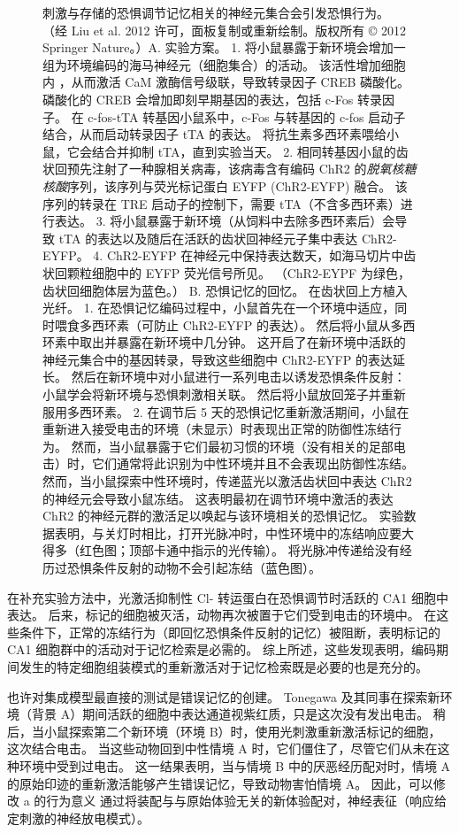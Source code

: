 \begin{figure}[htbp]
	\caption{刺激与存储的恐惧调节记忆相关的神经元集合会引发恐惧行为。 （经 Liu et al. 2012 许可，面板复制或重新绘制。版权所有 © 2012 Springer Nature。）A. 实验方案。 1. 将小鼠暴露于新环境会增加一组为环境编码的海马神经元（细胞集合）的活动。 该活性增加细胞内 ，从而激活 CaM 激酶信号级联，导致转录因子 CREB 磷酸化。 磷酸化的 CREB 会增加即刻早期基因的表达，包括 c-Fos 转录因子。 在 c-fos-tTA 转基因小鼠系中，c-Fos 与转基因的 c-fos 启动子结合，从而启动转录因子 tTA 的表达。 将抗生素多西环素喂给小鼠，它会结合并抑制 tTA，直到实验当天。 2. 相同转基因小鼠的齿状回预先注射了一种腺相关病毒，该病毒含有编码 ChR2 的\textit{脱氧核糖核酸}序列，该序列与荧光标记蛋白 EYFP (ChR2-EYFP) 融合。 该序列的转录在 TRE 启动子的控制下，需要 tTA（不含多西环素）进行表达。 3. 将小鼠暴露于新环境（从饲料中去除多西环素后）会导致 tTA 的表达以及随后在活跃的齿状回神经元子集中表达 ChR2-EYFP。 4. ChR2-EYFP 在神经元中保持表达数天，如海马切片中齿状回颗粒细胞中的 EYFP 荧光信号所见。 （ChR2-EYPF 为绿色，齿状回细胞体层为蓝色。） B. 恐惧记忆的回忆。 在齿状回上方植入光纤。 1. 在恐惧记忆编码过程中，小鼠首先在一个环境中适应，同时喂食多西环素（可防止 ChR2-EYFP 的表达）。 然后将小鼠从多西环素中取出并暴露在新环境中几分钟。 这开启了在新环境中活跃的神经元集合中的基因转录，导致这些细胞中 ChR2-EYFP 的表达延长。 然后在新环境中对小鼠进行一系列电击以诱发恐惧条件反射：小鼠学会将新环境与恐惧刺激相关联。 然后将小鼠放回笼子并重新服用多西环素。 2. 在调节后 5 天的恐惧记忆重新激活期间，小鼠在重新进入接受电击的环境（未显示）时表现出正常的防御性冻结行为。 然而，当小鼠暴露于它们最初习惯的环境（没有相关的足部电击）时，它们通常将此识别为中性环境并且不会表现出防御性冻结。 然而，当小鼠探索中性环境时，传递蓝光以激活齿状回中表达 ChR2 的神经元会导致小鼠冻结。 这表明最初在调节环境中激活的表达 ChR2 的神经元群的激活足以唤起与该环境相关的恐惧记忆。 实验数据表明，与关灯时相比，打开光脉冲时，中性环境中的冻结响应要大得多（红色图；顶部卡通中指示的光传输）。 将光脉冲传递给没有经历过恐惧条件反射的动物不会引起冻结（蓝色图）。}
	\label{fig:54_11}
\end{figure}


在补充实验方法中，光激活抑制性 Cl- 转运蛋白在恐惧调节时活跃的 CA1 细胞中表达。
后来，标记的细胞被灭活，动物再次被置于它们受到电击的环境中。
在这些条件下，正常的冻结行为（即回忆恐惧条件反射的记忆）被阻断，表明标记的 CA1 细胞群中的活动对于记忆检索是必需的。
综上所述，这些发现表明，编码期间发生的特定细胞组装模式的重新激活对于记忆检索既是必要的也是充分的。


也许对集成模型最直接的测试是错误记忆的创建。 Tonegawa 及其同事在探索新环境（背景 A）期间活跃的细胞中表达通道视紫红质，只是这次没有发出电击。
稍后，当小鼠探索第二个新环境（环境 B）时，使用光刺激重新激活标记的细胞，这次结合电击。
当这些动物回到中性情境 A 时，它们僵住了，尽管它们从未在这种环境中受到过电击。
这一结果表明，当与情境 B 中的厌恶经历配对时，情境 A 的原始印迹的重新激活能够产生错误记忆，导致动物害怕情境 A。
因此，可以修改 a 的行为意义 通过将装配与与原始体验无关的新体验配对，神经表征（响应给定刺激的神经放电模式）。



